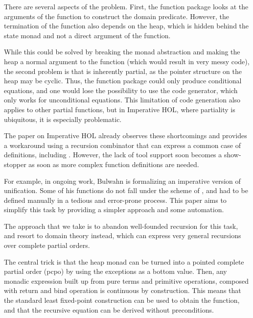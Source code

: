 \documentclass[copyright,creativecommons,sharealike]{eptcs}
\theoremstyle{remark}
\begin{document}
\begin{isabellebody}
\begin{isamarkuptext}
  There are several aspects of the problem. First, the function
  package looks at the arguments of the function to construct the
  domain predicate. However, the termination of the function also
  depends on the heap, which is hidden behind the state monad and not
  a direct argument of the function.

  While this could be solved by breaking the monad abstraction and
  making the heap a normal argument to the function (which would
  result in very messy code), 
  the second problem is that  is inherently partial,
  as the pointer structure on the heap may be cyclic. 
  Thus, the function package could only produce conditional equations,
  and one would lose the possibility to use the code generator, which
  only works for unconditional equations.  This limitation of code
  generation also applies to other partial functions, but in
  Imperative HOL, where partiality is ubiquitous, it is especially
  problematic.

  The paper on Imperative HOL \cite{imperativeFP} already observes these shortcomings and
  provides a workaround using a recursion combinator  that can express a common
  case of definitions, including . However, the lack
  of tool support soon becomes a show-stopper as soon as more complex
  function definitions are needed.
  
  For example, in ongoing work, Bulwahn is formalizing an imperative
  version of unification. Some of his functions do not fall under the
  scheme of , and had to be defined manually in a tedious
  and error-prone process.  This paper aims to simplify this task by
  providing a simpler approach and some automation.\end{isamarkuptext}\isamarkuptrue {}
\isamarkuptrue \begin{isamarkuptext}The approach that we take is to abandon well-founded
  recursion for this task, and resort to domain theory instead, which
  can express very general recursions over complete partial orders.

  The central trick is that the heap monad can be turned into a
  pointed complete partial order (pcpo) by using the exceptions as a
  bottom value. Then, any monadic expression built up from pure terms
  and primitive operations, composed with return and bind operation is
  continuous by construction. This means that the standard least
  fixed-point construction can be used to obtain the function, and
  that the recursive equation can be derived without preconditions.


\end{isamarkuptext}
\end{isabellebody}
\end{document}

